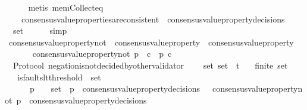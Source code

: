 \begin{isabellebody}
\ \ \ \ \isamarkupfalse%
\ {\isacharparenleft}metis\ mem{\isacharunderscore}Collect{\isacharunderscore}eq{\isacharparenright}\isanewline
\ \ \isamarkupfalse%
\isanewline
\ \ \ \ {\isachardoublequoteopen}consensus{\isacharunderscore}value{\isacharunderscore}properties{\isacharunderscore}are{\isacharunderscore}consistent\ {\isacharparenleft}{\isasymUnion}\ {\isacharbraceleft}consensus{\isacharunderscore}value{\isacharunderscore}property{\isacharunderscore}decisions\ {\isasymsigma}\ {\isacharbar}\ {\isasymsigma}{\isachardot}\ {\isasymsigma}\ {\isasymin}\ {\isasymsigma}{\isacharunderscore}set{\isacharbraceright}{\isacharparenright}{\isachardoublequoteclose}\isanewline
\ \ \ \ \isamarkupfalse%
\ simp\isanewline
{}\isamarkupfalse%
%
\endisatagproof
{\isafoldproof}%
%
\isadelimproof
\isanewline
%
\endisadelimproof
\isanewline
{}\isamarkupfalse%
\ consensus{\isacharunderscore}value{\isacharunderscore}property{\isacharunderscore}not\ {\isacharcolon}{\isacharcolon}\ {\isachardoublequoteopen}consensus{\isacharunderscore}value{\isacharunderscore}property\ {\isasymRightarrow}\ consensus{\isacharunderscore}value{\isacharunderscore}property{\isachardoublequoteclose}\isanewline
\ \ \isanewline
\ \ \ \ {\isachardoublequoteopen}consensus{\isacharunderscore}value{\isacharunderscore}property{\isacharunderscore}not\ p\ {\isacharequal}\ {\isacharparenleft}{\isasymlambda}c{\isachardot}\ {\isacharparenleft}{\isasymnot}\ p\ c{\isacharparenright}{\isacharparenright}{\isachardoublequoteclose}\isanewline
\isanewline
{}\isamarkupfalse%
\ {\isacharparenleft}\ Protocol{\isacharparenright}\ negation{\isacharunderscore}is{\isacharunderscore}not{\isacharunderscore}decided{\isacharunderscore}by{\isacharunderscore}other{\isacharunderscore}validator\ {\isacharcolon}\isanewline
\ \ {\isachardoublequoteopen}{\isasymforall}\ {\isasymsigma}{\isacharunderscore}set{\isachardot}\ {\isasymsigma}{\isacharunderscore}set\ {\isasymsubseteq}\ {\isasymSigma}t\isanewline
\ \ {\isasymlongrightarrow}\ finite\ {\isasymsigma}{\isacharunderscore}set\isanewline
\ \ {\isasymlongrightarrow}\ is{\isacharunderscore}faults{\isacharunderscore}lt{\isacharunderscore}threshold\ {\isacharparenleft}{\isasymUnion}\ {\isasymsigma}{\isacharunderscore}set{\isacharparenright}\isanewline
\ \ {\isasymlongrightarrow}\ {\isacharparenleft}{\isasymforall}\ {\isasymsigma}\ {\isasymsigma}{\isacharprime}\ p{\isachardot}\ {\isacharbraceleft}{\isasymsigma}{\isacharcomma}\ {\isasymsigma}{\isacharprime}{\isacharbraceright}\ {\isasymsubseteq}\ {\isasymsigma}{\isacharunderscore}set\ {\isasymand}\ p\ {\isasymin}\ consensus{\isacharunderscore}value{\isacharunderscore}property{\isacharunderscore}decisions\ {\isasymsigma}\ {\isasymlongrightarrow}\ consensus{\isacharunderscore}value{\isacharunderscore}property{\isacharunderscore}not\ p\ {\isasymnotin}\ consensus{\isacharunderscore}value{\isacharunderscore}property{\isacharunderscore}decisions\ {\isasymsigma}{\isacharprime}{\isacharparenright}{\isachardoublequoteclose}\isanewline

\end{isabellebody}
